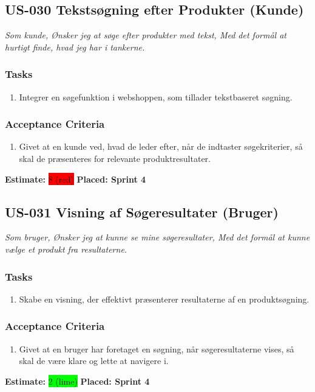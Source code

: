 \subsection{US-030 Tekstsøgning efter Produkter (Kunde)}
\label{sec:US-030}
\textit{Som kunde, Ønsker jeg at søge efter produkter med tekst, Med det formål at hurtigt finde, hvad jeg har i tankerne.}
\subsubsection*{\textbf{Tasks}}
\begin{enumerate}
  \item Integrer en søgefunktion i webshoppen, som tillader tekstbaseret søgning.
\end{enumerate}
\subsubsection*{\textbf{Acceptance Criteria}}
\begin{enumerate}
  \item Givet at en kunde ved, hvad de leder efter, når de indtaster søgekriterier, så skal de præsenteres for relevante produktresultater.
\end{enumerate}
\textbf{Estimate:} \colorbox{red}{8 (red)}
\textbf{Placed: Sprint 4}
\par\noindent\dotfill

\subsection{US-031 Visning af Søgeresultater (Bruger)}
\label{sec:US-031}
\textit{Som bruger, Ønsker jeg at kunne se mine søgeresultater, Med det formål at kunne vælge et produkt fra resultaterne.}
\subsubsection*{\textbf{Tasks}}
\begin{enumerate}
  \item Skabe en visning, der effektivt præsenterer resultaterne af en produktsøgning.
\end{enumerate}
\subsubsection*{\textbf{Acceptance Criteria}}
\begin{enumerate}
  \item Givet at en bruger har foretaget en søgning, når søgeresultaterne vises, så skal de være klare og lette at navigere i.
\end{enumerate}
\textbf{Estimate:} \colorbox{lime}{2 (lime)}
\textbf{Placed: Sprint 4}
\par\noindent\dotfill

